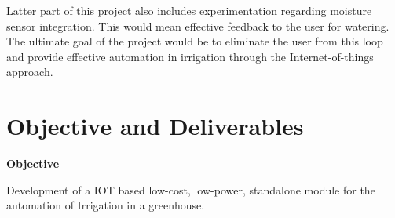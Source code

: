 \documentclass[16pt]{article}
\begin{document}
 Latter part of this project also includes experimentation regarding moisture sensor integration. This would mean effective feedback to the user for 
 watering. The ultimate goal of the project would be to eliminate the user from this loop and provide effective automation in irrigation through the 
 Internet-of-things approach.


\vspace{12cm}








\section{Objective and Deliverables} 

\vspace{1cm}
  {\Large{\textbf{Objective}}} \\
  
  \vspace{0.1cm}
  
  Development of a IOT based low-cost, low-power, standalone module for the automation of Irrigation in a greenhouse.
  
\end{document}
